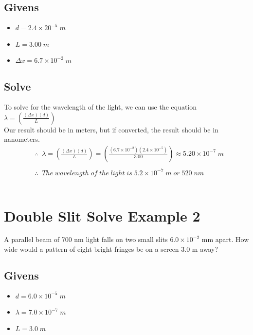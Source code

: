 \documentclass{article}
\begin{document}
\subsection*{Givens}
\begin{itemize}
    \item $d = 2.4 \times 20^{-5}\;m$
    \item $L = 3.00\;m $
    \item $\Delta x = 6.7 \times 10^{-2}\;m$
\end{itemize}\leavevmode
\subsection*{Solve}
To solve for the wavelength of the light, we can use the equation $\lambda = \left(\frac{(\Delta x)(d)}{L}\right)$\\ Our result should be in meters, but if converted, the result should be in nanometers.\\
\begin{align*}
     & \therefore\;\;\lambda = \left(\frac{(\Delta x)(d)}{L}\right) = \left(\frac{(6.7 \times 10^{-2})(2.4 \times 10^{-5})}{3.00}\right) \approx 5.20 \times 10^{-7}\;m \\\\
     & \therefore\;\;The\;wavelength\;of\;the\;light\;is\;5.2 \times 10^{-7}\;m\;or\;520\;nm
\end{align*}\leavevmode\\

\section*{Double Slit Solve Example 2}
A parallel beam of 700 nm light falls on two small slits $6.0 \times 10^{-2}$ mm apart. How wide would a pattern of eight bright fringes be on a screen 3.0 m away?
\subsection*{Givens}
\begin{itemize}
    \item $d = 6.0 \times 10^{-5}\;m$
    \item $\lambda = 7.0 \times 10^{-7}\;m$
    \item $L = 3.0\;m$
\end{itemize}\leavevmode
\end{document}
